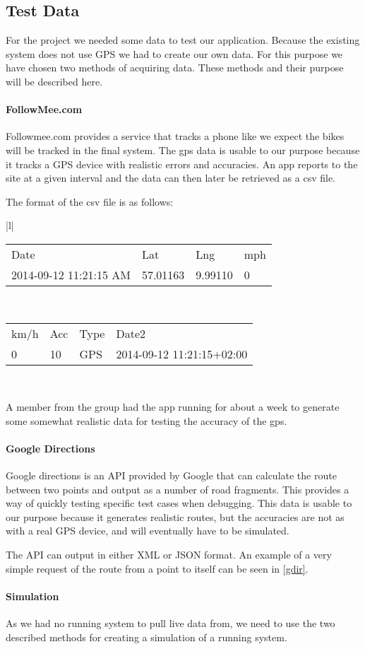 \subsection{Test Data}

For the project we needed some data to test our application.
Because the existing system does not use GPS we had to create our own data.
For this purpose we have chosen two methods of acquiring data.
These methods and their purpose will be described here.

\paragraph{FollowMee.com}
Followmee.com provides a service that tracks a phone like we expect the bikes will be tracked in the final system.
The gps data is usable to our purpose because it tracks a GPS device with realistic errors and accuracies.
An app reports to the site at a given interval and the data can then later be retrieved as a csv file.

The format of the csv file is as follows:

\noindent
\begin{tabular}{|l|}
\hline
\begin{tabular}{l l l l}
Date & Lat & Lng & mph  \\
2014-09-12 11:21:15 AM & 57.01163 & 9.99110&0 \\
\end{tabular}
\\
\hline
\hline
\begin{tabular}{l l l l}
\hline
km/h & Acc & Type & Date2\\
0&10&GPS&2014-09-12 11:21:15+02:00\\
\end{tabular}
\\
\hline
\end{tabular}

A member from the group had the app running for about a week to generate some somewhat realistic data for testing the accuracy of the gps.

\paragraph{Google Directions}
Google directions is an API provided by Google that can calculate the route between two points and output as a number of road fragments.
This provides a way of quickly testing specific test cases when debugging.
This data is usable to our purpose because it generates realistic routes, but the accuracies are not as with a real GPS device, and will eventually have to be simulated.

The API can output in either XML or JSON format.
An example of a very simple request of the route from a point to itself can be seen in \cref{gdir}.

\paragraph{Simulation}
As we had no running system to pull live data from, we need to use the two described methods for creating a simulation of a running system.
